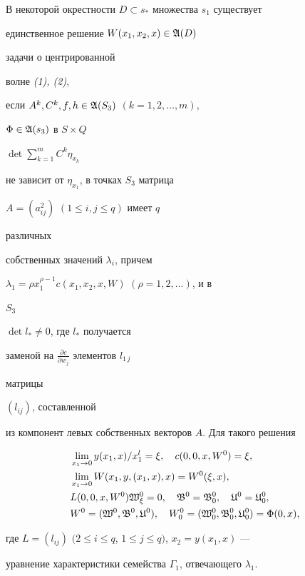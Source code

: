 \begin{thm}


В некоторой окрестности $D\subset s_*$ множества $s_1$ существует


единственное решение $W(x_1,x_2,x)\in\frak A(D)$


задачи о центрированной


волне {\em (1), (2)},


если $A^k,C^k,f,h\in\frak A(S_3)$ $(k=1,2,\dotsc,m)$,


$\Phi\in\frak A(s_3)$ в $S\times Q\;$


$\det\sum\limits^m_{k=1}C^k\eta_{x_k}$


не зависит от $\eta_{x_1}$, в точках $S_3$ матрица


$A=(a^2_{ij})$ $(1\le i,j\le q)$ имеет $q$


различных


собственных значений $\lambda_i$, причем


$\lambda_1=\rho x^{\rho-1}_1c(x_1,x_2,x,W)$ $(\rho=1,2,\dotsc)$, и в


$S_3\;$


$\det l_*\ne 0$, где $l_*$ получается


заменой на $\frac{\partial c}{\partial w_j}$ элементов $l_{1\,j}$


матрицы


$(l_{ij})$, составленной


из компонент левых собственных векторов $A$. Для такого решения


\begin{equation}


\begin{split}


&\lim_{x_1\to 0}y(x_1,x)/x^l_1=\xi,\quad


c(0,0,x,W^0)=\xi,\\


&\lim_{x_1\to 0}W(x_1,y,(x_1,x),x)=W^0(\xi,x),\\


&L(0,0,x,W^0)\frak W^0_\xi=0,\quad


\frak B^0=\frak B^0_0,\quad \frak U^0=\frak U^0_0,\\


&W^0=(\frak W^0,\frak B^0,\frak U^0),\quad


W^0_0=(\frak W^0_0,\frak B^0_0,\frak U^0_0)=\Phi(0,x),


\end{split}


\end{equation}


где $L=(l_{ij})$ $(2\le i\le q$, $1\le j\le q)$, $x_2=y(x_1,x)$ ---


уравнение характеристики семейства $\Gamma_1$, отвечающего $\lambda_1$.


\end{thm}





